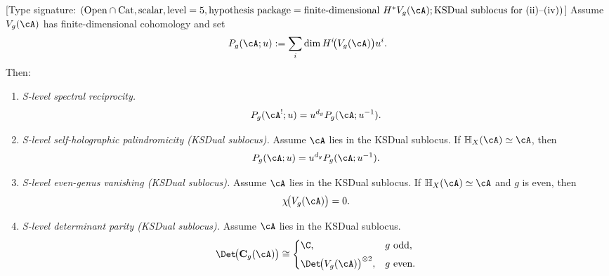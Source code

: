 \begin{corollary}
\label{cor:frontier-spectral-reciprocity-palindromicity}
\textup{[}Type signature:
$(\mathrm{Open}\cap\mathrm{Cat},\mathrm{scalar},\mathrm{level}=5,
\mathrm{hypothesis\ package}=\mathrm{finite\text{-}dimensional\ }H^*V_g(\cA);
\mathrm{KSDual\ sublocus\ for\ (ii)\text{--}(iv)})$\textup{]}
Assume $V_g(\cA)$ has finite-dimensional cohomology and set
\[
P_g(\cA;u):=\sum_i \dim H^i\!\bigl(V_g(\cA)\bigr)u^i.
\]
Then:
\begin{enumerate}[label=\textup{(\roman*)}]
\item \emph{S-level spectral reciprocity.}
 \begin{equation}\label{eq:frontier-spectral-reciprocity}
 P_g(\cA^!;u)=u^{d_g}P_g(\cA;u^{-1}).
 \end{equation}
\item \emph{S-level self-holographic palindromicity \textup{(}KSDual sublocus\textup{)}.}
 Assume $\cA$ lies in the KSDual sublocus.
 If $\mathbb H_X(\cA)\simeq \cA$, then
 \begin{equation}\label{eq:frontier-self-holographic-palindromicity}
 P_g(\cA;u)=u^{d_g}P_g(\cA;u^{-1}).
 \end{equation}
\item \emph{S-level even-genus vanishing \textup{(}KSDual sublocus\textup{)}.}
 Assume $\cA$ lies in the KSDual sublocus.
 If $\mathbb H_X(\cA)\simeq \cA$ and $g$ is even, then
 \begin{equation}\label{eq:frontier-even-genus-euler-vanishing}
 \chi\!\bigl(V_g(\cA)\bigr)=0.
 \end{equation}
\item \emph{S-level determinant parity \textup{(}KSDual sublocus\textup{)}.}
 Assume $\cA$ lies in the KSDual sublocus.
 \begin{equation}\label{eq:frontier-ambient-determinant-parity}
 \Det\!\bigl(\mathbf C_g(\cA)\bigr)
 \cong
 \begin{cases}
 \C, & g\ \text{odd},\\[4pt]
 \Det\!\bigl(V_g(\cA)\bigr)^{\otimes 2}, & g\ \text{even}.
 \end{cases}
 \end{equation}
\end{enumerate}
\end{corollary}

